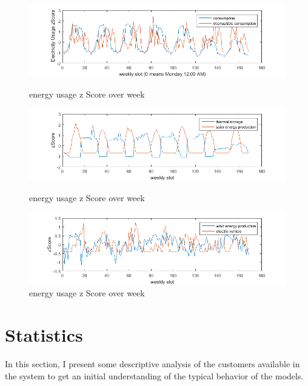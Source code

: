 \begin{figure}
\centering
\includegraphics[scale=0.85]{weekly1.png}
\caption{energy usage z Score over week}
\label{fig:weekly1}
\includegraphics[scale=0.85]{weekly2.png}
\caption{energy usage z Score over week}
\label{fig:weekly2}
\includegraphics[scale=0.85]{weekly3.png}
\caption{energy usage z Score over week}
\label{fig:weekly3}
\end{figure}


\section{Statistics}
In this section, I present some descriptive analysis of the customers available in the system to get an initial understanding of the typical behavior of the models. 

